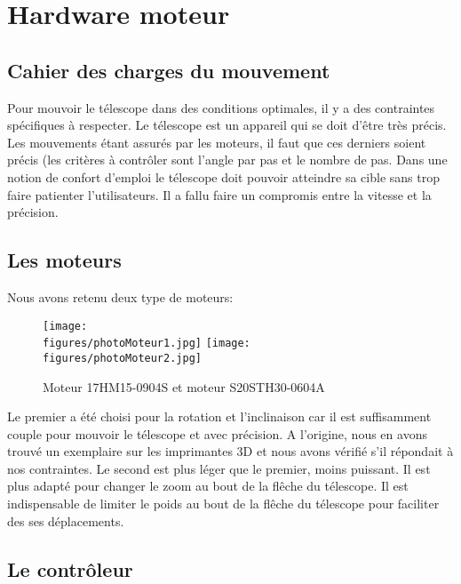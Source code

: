 \chapter{Hardware moteur}
\section{Cahier des charges du mouvement}
Pour mouvoir le télescope dans des conditions optimales, il y a des contraintes spécifiques à respecter. \newline
Le télescope est un appareil qui se doit d'être très précis. Les mouvements étant assurés par les moteurs, il faut que ces derniers soient précis (les critères à contrôler sont l'angle par pas et le nombre de pas.\newline 
Dans une notion de confort d'emploi le télescope doit pouvoir atteindre sa cible sans trop faire patienter l'utilisateurs.  \newline
Il a fallu faire un compromis entre la vitesse et la précision. \newline

\section{Les moteurs}

Nous avons retenu deux type de moteurs:

\begin{figure}[H]
    \centering
    \texttt{[image: \\figures/photoMoteur1.jpg]}
    \texttt{[image: \\figures/photoMoteur2.jpg]}
    \decoRule
    \caption[
    Moteur 17HM15-0904S et moteur S20STH30-0604A]{
    Moteur 17HM15-0904S et moteur S20STH30-0604A}
    \label{fig:Moteur 17HM15-0904S et moteur S20STH30-0604A}
    \end{figure}

Le premier a été choisi pour la rotation et l'inclinaison car il est suffisamment couple pour mouvoir le télescope et avec précision. \newline 
A l'origine, nous en avons trouvé un exemplaire sur les imprimantes 3D et nous avons vérifié s'il répondait à nos contraintes.  
Le second est plus léger que le premier, moins puissant. Il est plus adapté pour changer le zoom au bout de la flêche du télescope. Il est indispensable de limiter le poids au bout de la flêche du télescope pour faciliter des ses déplacements.   

\section{Le contrôleur}

